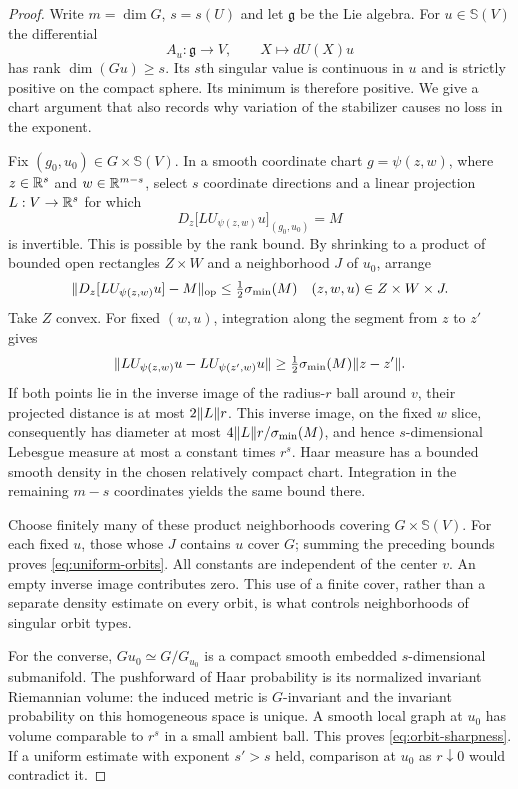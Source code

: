 \begin{proof}
Write $m=\dim G$, $s=s(U)$ and let $\mathfrak g$ be the Lie algebra.
For $u\in\mathbb S(V)$ the differential
\[
 A_u:\mathfrak g\longrightarrow V,\qquad X\longmapsto dU(X)u
\]
has rank $\dim(G u)\ge s$. Its $s$th singular value is continuous in
$u$ and is strictly positive on the compact sphere. Its minimum is
therefore positive. We give a chart argument that also records why
variation of the stabilizer causes no loss in the exponent.

Fix $(g_0,u_0)\in G\times\mathbb S(V)$. In a smooth coordinate chart
$g=\psi(z,w)$, where $z\in\mathbb R^s$ and $w\in\mathbb R^{m-s}$, select $s$
coordinate directions and a linear projection $L:V\to\mathbb R^s$ for which
\[
 D_z\bigl[L U_{\psi(z,w)}u\bigr]_{(g_0,u_0)}=M
\]
is invertible. This is possible by the rank bound. By shrinking to a
product of bounded open rectangles $Z\times W$ and a neighborhood
$J$ of $u_0$, arrange
\[
 \lVert D_z[L U_{\psi(z,w)}u]-M\rVert_{\rm op}
          \le\tfrac12\sigma_{\min}(M)
       \quad (z,w,u)\in Z\times W\times J.
\]
Take $Z$ convex. For fixed $(w,u)$, integration along the segment from
$z$ to $z'$ gives
\begin{equation}\label{eq:chart-co-lipschitz}
 \lVert L U_{\psi(z,w)}u-L U_{\psi(z',w)}u\rVert
       \ge\tfrac12\sigma_{\min}(M)\lVert z-z'\rVert.
\end{equation}
If both points lie in the inverse image of the radius-$r$ ball around
$v$, their projected distance is at most $2\lVert L\rVert r$. This inverse
image, on the fixed $w$ slice, consequently has diameter at most
$4\lVert L\rVert r/\sigma_{\min}(M)$, and hence $s$-dimensional Lebesgue
measure at most a constant times $r^s$. Haar measure has a bounded
smooth density in the chosen relatively compact chart. Integration
in the remaining $m-s$ coordinates yields the same bound there.

Choose finitely many of these product neighborhoods covering
$G\times\mathbb S(V)$. For each fixed $u$, those whose $J$ contains
$u$ cover $G$; summing the preceding bounds proves
\eqref{eq:uniform-orbits}. All constants are independent of the
center $v$. An empty inverse image contributes zero. This use of a
finite cover, rather than a separate density estimate on every orbit,
is what controls neighborhoods of singular orbit types.

For the converse, $G u_0\simeq G/G_{u_0}$ is a compact smooth embedded
$s$-dimensional submanifold. The pushforward of Haar probability is
its normalized invariant Riemannian volume: the induced metric is
$G$-invariant and the invariant probability on this homogeneous space
is unique. A smooth local graph at $u_0$ has volume comparable to
$r^s$ in a small ambient ball. This proves \eqref{eq:orbit-sharpness}.
If a uniform estimate with exponent $s'>s$ held, comparison at $u_0$
as $r\downarrow0$ would contradict it.
\end{proof}

